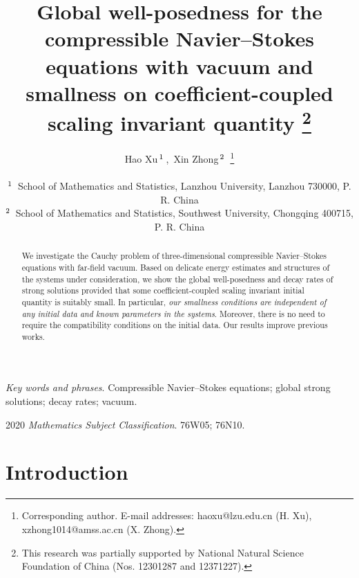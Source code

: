 \documentclass[11pt]{article}
\title{Global well-posedness for the compressible Navier--Stokes equations with vacuum and smallness on coefficient-coupled scaling invariant quantity
\thanks{This research was partially supported by  National Natural Science Foundation of China (Nos. 12301287 and 12371227).}
}
\author{Hao Xu$\,^{\rm 1}\,$,\
Xin Zhong$\,^{\rm 2}\,$ {\thanks{Corresponding author. E-mail addresses:
haoxu@lzu.edu.cn (H. Xu), xzhong1014@amss.ac.cn (X. Zhong).}}\date{}\\
\footnotesize $^{\rm 1}\,$
School of Mathematics and Statistics, Lanzhou University,
Lanzhou 730000, P. R. China\\
\footnotesize $^{\rm 2}\,$ School of Mathematics and Statistics, Southwest University, Chongqing 400715, P. R. China}
\begin{document}
\maketitle

\begin{abstract}
We investigate the Cauchy problem of three-dimensional compressible
Navier--Stokes equations with far-field vacuum. Based on delicate energy estimates and structures of the systems under consideration, we show the global well-posedness and decay rates of strong solutions provided that some coefficient-coupled scaling invariant initial quantity is suitably small. In particular, {\it our smallness conditions are independent of any initial data and known parameters in the systems}. Moreover, there is no need to require the compatibility conditions on the initial data. Our results improve previous works.
\end{abstract}

\textit{Key words and phrases}. Compressible Navier--Stokes equations; global strong solutions; decay rates; vacuum.

2020 \textit{Mathematics Subject Classification}. 76W05; 76N10.

\tableofcontents

\section{Introduction}\label{sec1}
\end{document}
